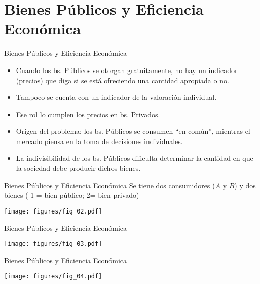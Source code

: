\section[Bién Público]{Bienes Públicos y Eficiencia Económica}

\begin{frame}{Bienes Públicos y Eficiencia Económica}
	\begin{itemize}
		\item Cuando los bs. Públicos se otorgan gratuitamente, no hay un indicador (precios) que diga si se está ofreciendo una cantidad apropiada o no. 
		\item Tampoco se cuenta con un indicador de la valoración individual.
		\item Ese rol lo cumplen los precios en bs. Privados.
		\item Origen del problema: los bs. Públicos se consumen “en común”, mientras el mercado piensa en la toma de decisiones individuales.
		\item La indivisibilidad de los bs. Públicos dificulta determinar la cantidad en que la sociedad debe producir dichos bienes.
	\end{itemize}
\end{frame}
\begin{frame}{Bienes Públicos y Eficiencia Económica}
	Se tiene dos consumidores ($A$ y $B$) y dos bienes ( 1 = bien público; 2= bien privado)
		\begin{center}
			\texttt{[image: figures/fig\_02.pdf]}
		\end{center}
\end{frame}
\begin{frame}{Bienes Públicos y Eficiencia Económica}
	\begin{center}
		\texttt{[image: figures/fig\_03.pdf]}
	\end{center}
\end{frame}
\begin{frame}{Bienes Públicos y Eficiencia Económica}
	\begin{center}
		\texttt{[image: figures/fig\_04.pdf]}
	\end{center}
\end{frame}
